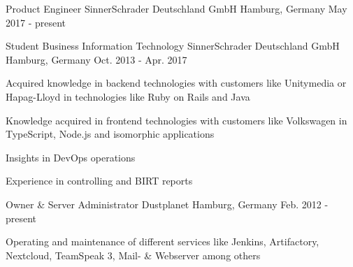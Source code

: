 

\begin{cventries}

  \cventry
    {Product Engineer} %
    {SinnerSchrader Deutschland GmbH} %
    {Hamburg, Germany} %
    {May 2017 - present} %
    {
    }

  \cventry
    {Student Business Information Technology} %
    {SinnerSchrader Deutschland GmbH} %
    {Hamburg, Germany} %
    {Oct. 2013 - Apr. 2017} %
    {
      \begin{cvitems} %
        \item {Acquired knowledge in backend technologies with customers like Unitymedia or Hapag-Lloyd in technologies like Ruby on Rails and Java}
        \item {Knowledge acquired in frontend technologies with customers like Volkswagen in TypeScript, Node.js and isomorphic applications}
        \item {Insights in DevOps operations}
        \item {Experience in controlling and BIRT reports}
      \end{cvitems}
    }

  \cventry
    {Owner \& Server Administrator} %
    {Dustplanet} %
    {Hamburg, Germany} %
    {Feb. 2012 - present} %
    {
      \begin{cvitems} %
      	\item {Operating and maintenance of different services like Jenkins, Artifactory, Nextcloud, TeamSpeak 3, Mail- \& Webserver among others}
      \end{cvitems}
    }

\end{cventries}

